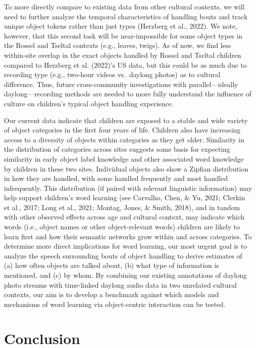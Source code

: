 \documentclass[10pt, letterpaper]{article}
\begin{document}
To more directly compare to existing data from other cultural contexts,
we will need to further analyze the temporal characteristics of handling
bouts and track unique object tokens rather than just types (Herzberg et
al., 2022). We note, however, that this second task will be
near-impossible for some object types in the Rossel and Tseltal contexts
(e.g., leaves, twigs). As of now, we find less within-site overlap in
the exact objects handled by Rossel and Tseltal children compared to
Herzberg et al. (2022)'s US data, but this could be as much due to
recording type (e.g., two-hour videos vs.~daylong photos) as to cultural
difference. Thus, future cross-community investigations with
parallel---ideally daylong---recording methods are needed to more fully
understand the influence of culture on children's typical object
handling experience.

Our current data indicate that children are exposed to a stable and wide
variety of object categories in the first four years of life. Children
also have increasing access to a diversity of objects within categories
as they get older. Similarity in the distribution of categories across
sites suggests some basis for expecting similarity in early object label
knowledge and other associated word knowledge by children in these two
sites. Individual objects also show a Zipfian distribution in how they
are handled, with some handled frequently and most handled infrequently.
This distribution (if paired with relevant linguistic information) may
help support children's word learning (see Carvalho, Chen, \& Yu, 2021;
Clerkin et al., 2017; Long et al., 2021; Montag, Jones, \& Smith, 2018),
and in tandem with other observed effects across age and cultural
context, may indicate which words (i.e., object names or other
object-relevant words) children are likely to learn first and how their
semantic networks grow within and across categories. To determine more
direct implications for word learning, our most urgent goal is to
analyze the speech surrounding bouts of object handling to derive
estimates of (a) how often objects are talked about, (b) what type of
information is mentioned, and (c) by whom. By combining our existing
annotations of daylong photo streams with time-linked daylong audio data
in two unrelated cultural contexts, our aim is to develop a benchmark
against which models and mechanisms of word learning via object-centric
interaction can be tested.

\hypertarget{conclusion}{%
\section{Conclusion}\label{conclusion}}
\end{document}
